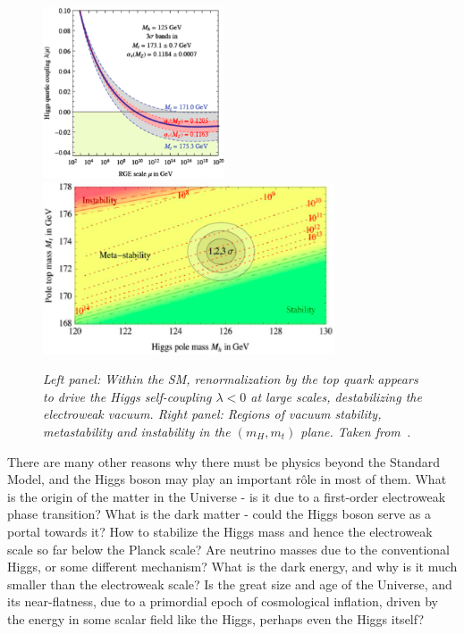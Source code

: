 \documentclass[12pt]{article}
\numberwithin{equation}{section}
\begin{document}
\begin{figure}[htb]
\centering
\includegraphics[height=2in]{Buttazzo1.png}
\hspace{0.5cm}
\includegraphics[height=2in]{Buttazzo2.png}
\caption{\it Left panel: Within the SM, renormalization by the top quark appears to drive the Higgs self-coupling $\lambda < 0$ at
large scales, destabilizing the electroweak vacuum. Right panel: Regions of vacuum stability, metastability and instability in the $(m_H, m_t)$ plane.
Taken from~\protect\cite{Buttazzo}.}
\label{fig:Buttazzo}
\end{figure}

There are many other reasons why there must be physics beyond the Standard Model, and the Higgs boson
may play an important r\^ole in most of them. What is the origin of the matter in the Universe - is it due to
a first-order electroweak phase transition? What is the dark matter - could the Higgs boson serve as a portal
towards it? How to stabilize the Higgs mass and hence the electroweak scale so far below the Planck scale?
Are neutrino masses due to the conventional Higgs, or some different mechanism? What is the dark energy, and why
is it much smaller than the electroweak scale? Is the great size and age of the Universe, and its near-flatness, due
to a primordial epoch of cosmological inflation, driven by the energy in some scalar field like the Higgs, perhaps
even the Higgs itself?
\end{document}
